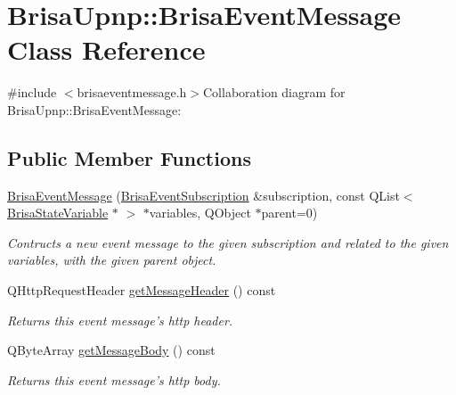 \hypertarget{classBrisaUpnp_1_1BrisaEventMessage}{
\section{BrisaUpnp::BrisaEventMessage Class Reference}
\label{classBrisaUpnp_1_1BrisaEventMessage}
}


{\ttfamily \#include $<$brisaeventmessage.h$>$}Collaboration diagram for BrisaUpnp::BrisaEventMessage:\subsection*{Public Member Functions}
\begin{DoxyCompactItemize}
\item 
\hyperlink{classBrisaUpnp_1_1BrisaEventMessage_a66bde1d910078c764004d98bc20dc91e}{BrisaEventMessage} (\hyperlink{classBrisaUpnp_1_1BrisaEventSubscription}{BrisaEventSubscription} \&subscription, const QList$<$ \hyperlink{classBrisaUpnp_1_1BrisaStateVariable}{BrisaStateVariable} $\ast$ $>$ $\ast$variables, QObject $\ast$parent=0)
\begin{DoxyCompactList}\small\item\em Contructs a new event message to the given {\itshape subscription\/} and related to the given {\itshape variables\/}, with the given {\itshape parent\/} object. \item\end{DoxyCompactList}\item 
QHttpRequestHeader \hyperlink{classBrisaUpnp_1_1BrisaEventMessage_aa457aeb063c630875d09de44fe3f0ca5}{getMessageHeader} () const 
\begin{DoxyCompactList}\small\item\em Returns this event message's http header. \item\end{DoxyCompactList}\item 
QByteArray \hyperlink{classBrisaUpnp_1_1BrisaEventMessage_ab984d75c57d4641dec88f0c31bea1e48}{getMessageBody} () const 
\begin{DoxyCompactList}\small\item\em Returns this event message's http body. \item\end{DoxyCompactList}\end{DoxyCompactItemize}


